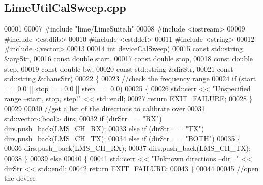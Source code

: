 \subsection{Lime\+Util\+Cal\+Sweep.\+cpp}
\label{LimeUtilCalSweep_8cpp_source}

\begin{DoxyCode}
00001 
00007 \textcolor{preprocessor}{#include "lime/LimeSuite.h"}
00008 \textcolor{preprocessor}{#include <iostream>}
00009 \textcolor{preprocessor}{#include <cstdlib>}
00010 \textcolor{preprocessor}{#include <cstddef>}
00011 \textcolor{preprocessor}{#include <string>}
00012 \textcolor{preprocessor}{#include <vector>}
00013 
00014 \textcolor{keywordtype}{int} deviceCalSweep(
00015     \textcolor{keyword}{const} std::string &argStr,
00016     \textcolor{keyword}{const} \textcolor{keywordtype}{double} start,
00017     \textcolor{keyword}{const} \textcolor{keywordtype}{double} stop,
00018     \textcolor{keyword}{const} \textcolor{keywordtype}{double} step,
00019     \textcolor{keyword}{const} \textcolor{keywordtype}{double} bw,
00020     \textcolor{keyword}{const} std::string &dirStr,
00021     \textcolor{keyword}{const} std::string &chansStr)
00022 \{
00023     \textcolor{comment}{//check the frequency range}
00024     \textcolor{keywordflow}{if} (start == 0.0 || stop == 0.0 || step == 0.0)
00025     \{
00026         std::cerr << \textcolor{stringliteral}{"Unspecified range --start, stop, step!"} << std::endl;
00027         \textcolor{keywordflow}{return} EXIT\_FAILURE;
00028     \}
00029 
00030     \textcolor{comment}{//get a list of the directions to calibrate over}
00031     std::vector<bool> dirs;
00032     \textcolor{keywordflow}{if} (dirStr == \textcolor{stringliteral}{"RX"}) dirs.push\_back(LMS_CH_RX);
00033     \textcolor{keywordflow}{else} \textcolor{keywordflow}{if} (dirStr == \textcolor{stringliteral}{"TX"}) dirs.push\_back(LMS_CH_TX);
00034     \textcolor{keywordflow}{else} \textcolor{keywordflow}{if} (dirStr == \textcolor{stringliteral}{"BOTH"})
00035     \{
00036         dirs.push\_back(LMS_CH_RX);
00037         dirs.push\_back(LMS_CH_TX);
00038     \}
00039     \textcolor{keywordflow}{else}
00040     \{
00041         std::cerr << \textcolor{stringliteral}{"Unknown directions --dir="} << dirStr << std::endl;
00042         \textcolor{keywordflow}{return} EXIT\_FAILURE;
00043     \}
00044 
00045     \textcolor{comment}{//open the device}

\end{DoxyCode}
